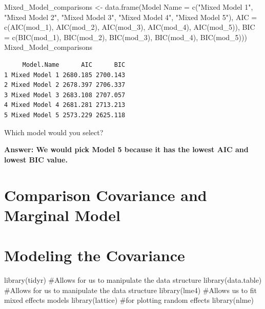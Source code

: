 \documentclass[
  letterpaper,
  DIV=11,
  numbers=noendperiod]{scrreprt}
\newenvironment{Shaded}{\begin{snugshade}}{\end{snugshade}}
\newcommand{\AttributeTok}[1]{\textcolor[rgb]{0.40,0.45,0.13}{#1}}
\newcommand{\CommentTok}[1]{\textcolor[rgb]{0.37,0.37,0.37}{#1}}
\newcommand{\FunctionTok}[1]{\textcolor[rgb]{0.28,0.35,0.67}{#1}}
\newcommand{\NormalTok}[1]{\textcolor[rgb]{0.00,0.23,0.31}{#1}}
\newcommand{\OtherTok}[1]{\textcolor[rgb]{0.00,0.23,0.31}{#1}}
\newcommand{\StringTok}[1]{\textcolor[rgb]{0.13,0.47,0.30}{#1}}
\begin{document}
\begin{Shaded}
\begin{Highlighting}[]
\NormalTok{Mixed\_Model\_comparisons }\OtherTok{\textless{}{-}} \FunctionTok{data.frame}\NormalTok{(}\StringTok{\textasciigrave{}}\AttributeTok{Model Name}\StringTok{\textasciigrave{}} \OtherTok{=} \FunctionTok{c}\NormalTok{(}\StringTok{"Mixed Model 1"}\NormalTok{, }\StringTok{"Mixed Model 2"}\NormalTok{,}
    \StringTok{"Mixed Model 3"}\NormalTok{, }\StringTok{"Mixed Model 4"}\NormalTok{, }\StringTok{"Mixed Model 5"}\NormalTok{), }\AttributeTok{AIC =} \FunctionTok{c}\NormalTok{(}\FunctionTok{AIC}\NormalTok{(mod\_1), }\FunctionTok{AIC}\NormalTok{(mod\_2),}
    \FunctionTok{AIC}\NormalTok{(mod\_3), }\FunctionTok{AIC}\NormalTok{(mod\_4), }\FunctionTok{AIC}\NormalTok{(mod\_5)), }\AttributeTok{BIC =} \FunctionTok{c}\NormalTok{(}\FunctionTok{BIC}\NormalTok{(mod\_1), }\FunctionTok{BIC}\NormalTok{(mod\_2), }\FunctionTok{BIC}\NormalTok{(mod\_3),}
    \FunctionTok{BIC}\NormalTok{(mod\_4), }\FunctionTok{BIC}\NormalTok{(mod\_5)))}
\NormalTok{Mixed\_Model\_comparisons}
\end{Highlighting}
\end{Shaded}

\begin{verbatim}
     Model.Name      AIC      BIC
1 Mixed Model 1 2680.185 2700.143
2 Mixed Model 2 2678.397 2706.337
3 Mixed Model 3 2683.108 2707.057
4 Mixed Model 4 2681.281 2713.213
5 Mixed Model 5 2573.229 2625.118
\end{verbatim}

Which model would you select?

\textbf{Answer: We would pick Model 5 because it has the lowest AIC and
lowest BIC value.}

\hypertarget{sec-longi-compare}{%
\chapter{Comparison Covariance and Marginal
Model}\label{sec-longi-compare}}

\hypertarget{sec-longi-covmodel}{%
\chapter{Modeling the Covariance}\label{sec-longi-covmodel}}

\begin{Shaded}
\begin{Highlighting}[]
\FunctionTok{library}\NormalTok{(tidyr)  }\CommentTok{\#Allows for us to manipulate the data structure}
\FunctionTok{library}\NormalTok{(data.table)  }\CommentTok{\#Allows for us to manipulate the data structure}
\FunctionTok{library}\NormalTok{(lme4)  }\CommentTok{\#Allows us to fit mixed effects models}
\FunctionTok{library}\NormalTok{(lattice)  }\CommentTok{\#for plotting random effects}
\FunctionTok{library}\NormalTok{(nlme)}
\end{Highlighting}
\end{Shaded}
\end{document}
